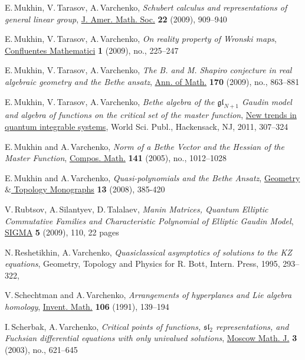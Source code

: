 \documentclass[12pt]{amsart}
\let\frak\mathfrak
\numberwithin{equation}{section}
\theoremstyle{definition}
\let\bi\bibitem
\def\slt{{\frak{sl}_2}}
\begin{document}
\begin{thebibliography}{[COGP]}
\bi[MTV3]{MTV3}
E.\,Mukhin, V.\,Tarasov, A.\,Varchenko, {\it
Schubert calculus and representations of general linear group\/}, \href{https://doi.org/10.1090/S0894-0347-09-00640-7}{J. Amer. Math. Soc.} {\bf 22} (2009), 909--940


\bi[MTV4]{MTV4}
E.\,Mukhin, V.\,Tarasov, A.\,Varchenko,
{\it On reality property of Wronski maps},
\href{https://doi.org/10.1142/S1793744209000092}{Confluentes Mathematici} {\bf 1} (2009), no., 225--247


\bi[MTV5]{MTV5}
E.\,Mukhin, V.\,Tarasov, A.\,Varchenko,
{\it
The B. and M. Shapiro conjecture in real algebraic geometry and the Bethe ansatz},
\href{https://doi.org/10.4007/annals.2009.170.863}{Ann. of Math.} {\bf 170}  (2009), no., 863--881


\bi[MTV6]{MTV6}
E.\,Mukhin, V.\,Tarasov, A.\,Varchenko,
 {\it
Bethe algebra of the $\frak{gl}_{N+1}$ Gaudin model and algebra of functions on the critical set of the master function}, \href{https://doi.org/10.1142/9789814324373_0016}{New trends in quantum integrable systems}, World Sci. Publ., Hackensack, NJ, 2011, 307--324


\bi[MV1]{MV1}
E.\,Mukhin and A.\,Varchenko,
 {\it
Norm of a Bethe Vector and the Hessian of the Master Function},
 \href{https://doi.org/10.1112/S0010437X05001569}{Compos. Math.} {\bf 141} (2005), no., 1012--1028


\bi[MV2]{MV2}
E.\,Mukhin and A.\,Varchenko,
{\it Quasi-polynomials and the Bethe Ansatz}, \href{https://doi.org/10.2140/gtm.2008.13.385}{Geometry $\&$ Topology Monographs} {\bf 13} (2008), 385-420


\bi[RST]{RST}  V.\,Rubtsov, A.\,Silantyev, D.\,Talalaev,
{\it  Manin Matrices, Quantum Elliptic Commutative Families and Characteristic Polynomial of Elliptic Gaudin Model},
\href{https://doi.org/10.3842/SIGMA.2009.110}{SIGMA} {\bf 5} (2009), 110, 22 pages


\bi[RV]{RV}
N.\,Reshetikhin, A.\,Varchenko, {\it
Quasiclassical asymptotics of solutions to the KZ equations},
 Geometry, Topology and Physics for R. Bott, Intern. Press, 1995, 293--322, 


\bi[SV]{SV} V.\,Schechtman and A.\,Varchenko, {\it Arrangements of hyperplanes
and Lie algebra homology\/}, \href{https://doi.org/10.1007/BF01243909}{Invent. Math.} {\bf 106} (1991), 139--194


\bi[ScV]{ScV} I.\,Scherbak, A.\,Varchenko, {\it
Critical points of functions, $\slt$ representations, and
Fuchsian differential equations with  only univalued solutions}, \href{https://doi.org/10.17323/1609-4514-2003-3-2-621-645}{Moscow Math. J.} {\bf 3} (2003), no., 621--645
 


\end{thebibliography}
\end{document}
